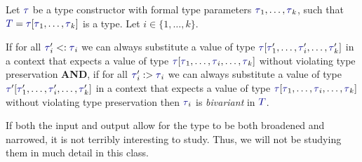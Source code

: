 \begin{definition}[Bivariance]\label{def:Type_Bivariance}
  Let $\DataType$ be a type constructor with formal type parameters $\DataType_{1}, \ldots , \DataType_{k}$, such that $\SemanticType{T} = \DataType [\DataType_{1}, \ldots, \DataType_{k}]$ is a type.
  Let $i \in \lbrace 1,\ldots, k \rbrace$.

  If for all $\DataType_{i}' <: \DataType_{i}$ we can always substitute a value of type $\DataType [\DataType_{1}',\ldots, \DataType_{i}', \ldots, \DataType_{k}']$ in a context that expects a value of type $\DataType [\DataType_{1}, \ldots, \DataType_{i}, \ldots, \DataType_{k}]$ without violating type preservation \textbf{AND}, if for all $\DataType_{i}' :> \DataType_{i}$ we can always substitute a value of type $\DataType' [\DataType_{1}', \ldots, \DataType_{i}', \ldots, \DataType_{k}']$ in a context that expects a value of type $\DataType [\DataType_{1}, \ldots, \DataType_{i}, \ldots, \DataType_{k}]$ without violating type preservation then $\DataType_{i}$ is \emph{bivariant} in $\SemanticType{T}$.

  \begin{remark}
    If both the input and output allow for the type to be both broadened and narrowed, it is not terribly interesting to study.
    Thus, we will not be studying them in much detail in this class.
  \end{remark}
\end{definition}

